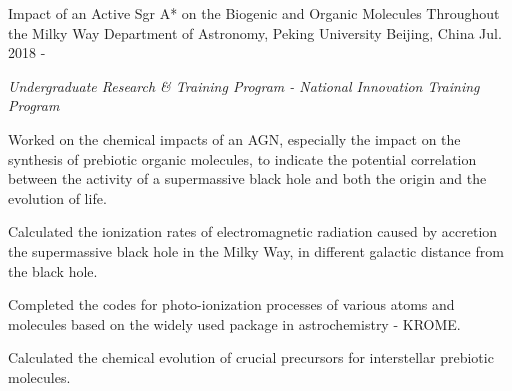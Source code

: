 


\begin{cventries}


\cventry
{Impact of an Active Sgr A* on the Biogenic and Organic Molecules Throughout the Milky Way} %
{Department of Astronomy, Peking University} %
{Beijing, China} %
{Jul. 2018 - } %
{ %
\begin{cvitems}
\item {\textit{Undergraduate Research \& Training Program - National Innovation Training Program}}
\item {Worked on the chemical impacts of an AGN, especially the impact on the synthesis of prebiotic organic molecules, to indicate the potential correlation between the activity of a supermassive black hole and both the origin and the evolution of life.}
\item {Calculated the ionization rates of electromagnetic radiation caused by accretion the supermassive black hole in the Milky Way, in different galactic distance from the black hole.}
\item {Completed the codes for photo-ionization processes of various atoms and molecules based on the widely used package in astrochemistry - KROME.}
\item {Calculated the chemical evolution of crucial precursors for interstellar prebiotic molecules.}
\end{cvitems}
}


\end{cventries}
